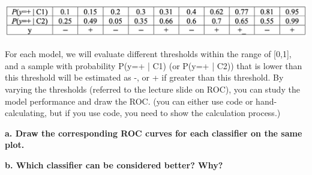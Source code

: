 \includegraphics[width=1\textwidth]{media/hw5_q2.png}

For each model, we will evaluate different thresholds within the range of [0,1], and a sample with probability P(y=+ | C1) (or P(y=+ | C2)) that is lower than this threshold will be estimated as -, or + if greater than this threshold. By varying the thresholds (referred to the lecture slide on ROC), you can study the model performance and draw the ROC. (you can either use code or hand-calculating, but if you use code, you need to show the calculation process.)

\textbf{a. Draw the corresponding ROC curves for each classifier on the same plot.}

\textbf{b. Which classifier can be considered better? Why?}
